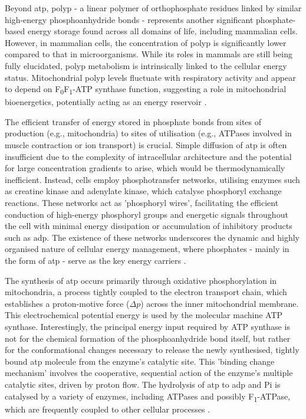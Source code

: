 Beyond \ac{atp}, \ac{polyp} - a linear polymer of orthophosphate residues linked by similar high-energy phosphoanhydride bonds - represents another significant phosphate-based energy storage found across all domains of life, including mammalian cells. However, in mammalian cells, the concentration of \ac{polyp} is significantly lower compared to that in microorganisms. While its roles in mammals are still being fully elucidated, \ac{polyp} metabolism is intrinsically linked to the cellular energy status. Mitochondrial \ac{polyp} levels fluctuate with respiratory activity and appear to depend on F\textsubscript{0}F\textsubscript{1}-ATP synthase function, suggesting a role in mitochondrial bioenergetics, potentially acting as an energy reservoir \citep{pavlovInorganicPolyphosphateEnergy2010}.

The efficient transfer of energy stored in phosphate bonds from sites of production (e.g., mitochondria) to sites of utilisation (e.g., ATPases involved in muscle contraction or ion transport) is crucial. Simple diffusion of \ac{atp} is often insufficient due to the complexity of intracellular architecture and the potential for large concentration gradients to arise, which would be thermodynamically inefficient. Instead, cells employ phosphotransfer networks, utilising enzymes such as creatine kinase and adenylate kinase, which catalyse phosphoryl exchange reactions. These networks act as 'phosphoryl wires', facilitating the efficient conduction of high-energy phosphoryl groups and energetic signals throughout the cell with minimal energy dissipation or accumulation of inhibitory products such as \ac{adp}. The existence of these networks underscores the dynamic and highly organised nature of cellular energy management, where phosphates - mainly in the form of \ac{atp} - serve as the key energy carriers \citep{dzejaPhosphotransferNetworksCellular2003}.

The synthesis of \ac{atp} occurs primarily through oxidative phosphorylation in mitochondria, a process tightly coupled to the electron transport chain, which establishes a proton-motive force ($\Delta p$) across the inner mitochondrial membrane. This electrochemical potential energy is used by the molecular machine ATP synthase. Interestingly, the principal energy input required by ATP synthase is not for the chemical formation of the phosphoanhydride bond itself, but rather for the conformational changes necessary to release the newly synthesised, tightly bound \ac{atp} molecule from the enzyme's catalytic site. This 'binding change mechanism' involves the cooperative, sequential action of the enzyme's multiple catalytic sites, driven by proton flow. The hydrolysis of \ac{atp} to \ac{adp} and \ac{Pi} is catalysed by a variety of enzymes, including ATPases and possibly F\textsubscript{1}-ATPase, which are frequently coupled to other cellular processes \citep{boyerEnergyLifeATP1998}.

